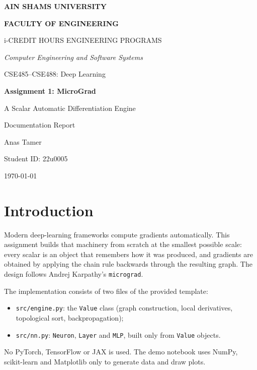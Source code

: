 \documentclass[11pt,a4paper]{article}
\newcommand{\studentname}{Anas Tamer}
\newcommand{\studentid}{22u0005}
\begin{document}
\begin{titlepage}
\centering
{\large\textbf{AIN SHAMS UNIVERSITY}\par}
{\large\textbf{FACULTY OF ENGINEERING}\par}
{i-CREDIT HOURS ENGINEERING PROGRAMS\par}
{\itshape Computer Engineering and Software Systems\par}
\vspace{3cm}
{\Large CSE485--CSE488: Deep Learning\par}
\vspace{0.6cm}
{\LARGE\bfseries Assignment 1: MicroGrad\par}
{\Large A Scalar Automatic Differentiation Engine\par}
\vspace{0.6cm}
{\large Documentation Report\par}
\vfill
{\large \studentname\par}
{\large Student ID: \studentid\par}
\vspace{1cm}
{\large \today\par}
\end{titlepage}

\tableofcontents
\newpage

\section{Introduction}
Modern deep-learning frameworks compute gradients automatically. This assignment builds that machinery
from scratch at the smallest possible scale: every scalar is an object that remembers how it was
produced, and gradients are obtained by applying the chain rule backwards through the resulting graph.
The design follows Andrej Karpathy's \texttt{micrograd}.

The implementation consists of two files of the provided template:
\begin{itemize}
  \item \texttt{src/engine.py}: the \texttt{Value} class (graph construction, local derivatives,
        topological sort, backpropagation);
  \item \texttt{src/nn.py}: \texttt{Neuron}, \texttt{Layer} and \texttt{MLP}, built only from \texttt{Value} objects.
\end{itemize}
No PyTorch, TensorFlow or JAX is used. The demo notebook uses NumPy, scikit-learn and Matplotlib only to
generate data and draw plots.
\end{document}
